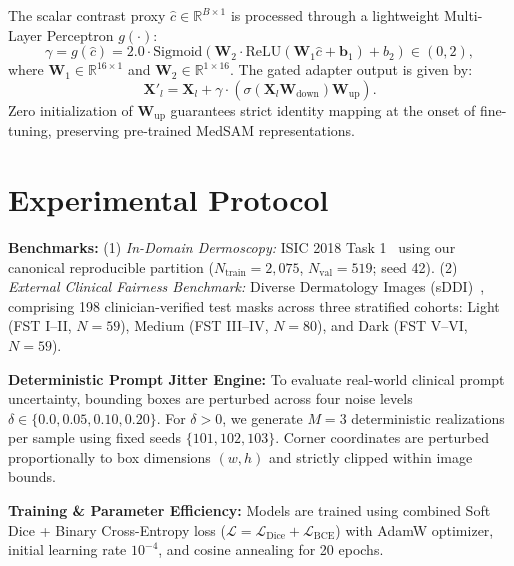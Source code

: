 \documentclass[runningheads]{llncs}
\begin{document}
The scalar contrast proxy $\hat{c} \in \mathbb{R}^{B \times 1}$ is processed through a lightweight Multi-Layer Perceptron $g(\cdot)$:
\begin{equation}
\gamma = g(\hat{c}) = 2.0 \cdot \text{Sigmoid}\left( \mathbf{W}_2 \cdot \text{ReLU}(\mathbf{W}_1 \hat{c} + \mathbf{b}_1) + b_2 \right) \in (0, 2),
\end{equation}
where $\mathbf{W}_1 \in \mathbb{R}^{16 \times 1}$ and $\mathbf{W}_2 \in \mathbb{R}^{1 \times 16}$. The gated adapter output is given by:
\begin{equation}
\mathbf{X}'_l = \mathbf{X}_l + \gamma \cdot \left( \sigma(\mathbf{X}_l \mathbf{W}_{\text{down}}) \mathbf{W}_{\text{up}} \right).
\end{equation}
Zero initialization of $\mathbf{W}_{\text{up}}$ guarantees strict identity mapping at the onset of fine-tuning, preserving pre-trained MedSAM representations.

\section{Experimental Protocol}
\textbf{Benchmarks:} (1) \textit{In-Domain Dermoscopy:} ISIC 2018 Task 1~\cite{codella2018skin} using our canonical reproducible partition ($N_{\text{train}} = 2,075$, $N_{\text{val}} = 519$; seed 42). (2) \textit{External Clinical Fairness Benchmark:} Diverse Dermatology Images (sDDI)~\cite{carrion2023fedd}, comprising 198 clinician-verified test masks across three stratified cohorts: Light (FST I--II, $N=59$), Medium (FST III--IV, $N=80$), and Dark (FST V--VI, $N=59$).

\textbf{Deterministic Prompt Jitter Engine:} To evaluate real-world clinical prompt uncertainty, bounding boxes are perturbed across four noise levels $\delta \in \{0.0, 0.05, 0.10, 0.20\}$. For $\delta > 0$, we generate $M=3$ deterministic realizations per sample using fixed seeds $\{101, 102, 103\}$. Corner coordinates are perturbed proportionally to box dimensions $(w, h)$ and strictly clipped within image bounds.

\textbf{Training & Parameter Efficiency:} Models are trained using combined Soft Dice + Binary Cross-Entropy loss ($\mathcal{L} = \mathcal{L}_{\text{Dice}} + \mathcal{L}_{\text{BCE}}$) with AdamW optimizer, initial learning rate $10^{-4}$, and cosine annealing for 20 epochs.
\end{document}
